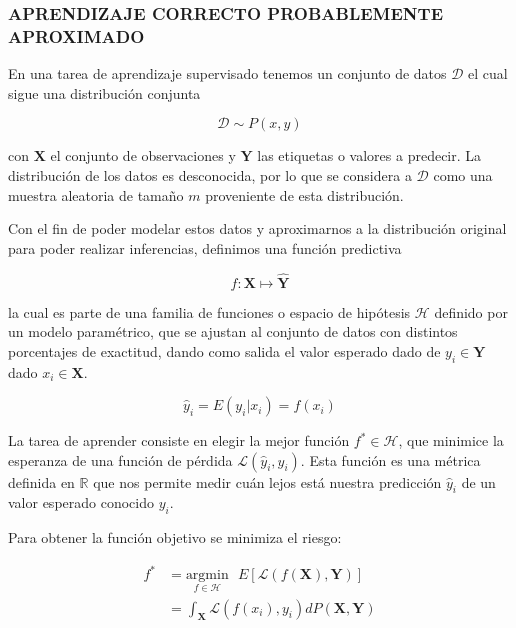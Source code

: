         \subsubsection{APRENDIZAJE CORRECTO PROBABLEMENTE APROXIMADO}
        En una tarea de aprendizaje supervisado tenemos un conjunto de datos $\mathcal{D}$ el cual sigue una distribución conjunta
        
        $$\mathcal{D} \sim P(x, y)$$
        
        \noindent con $\mathbf{X}$ el conjunto de observaciones y $\mathbf{Y}$ las etiquetas o valores a predecir. La distribución de los datos es desconocida, por lo que se considera a $\mathcal{D}$ como una muestra aleatoria de tamaño $m$ proveniente de esta distribución.
        
        Con el fin de poder modelar estos datos y aproximarnos a la distribución original para poder realizar inferencias, definimos una función predictiva
        
        $$f: \mathbf{X} \mapsto \mathbf{\hat{Y}}$$
        
        \noindent la cual es parte de una familia de funciones o espacio de hipótesis $\mathcal{H}$ definido por un modelo paramétrico, que se ajustan al conjunto de datos con distintos porcentajes de exactitud, dando como salida el valor esperado dado de $y_i \in \mathbf{Y}$ dado $x_i \in \mathbf{X}$.
        
        $$\hat{y}_i = E(y_i|x_i) = f(x_i)$$
        
        La tarea de aprender consiste en elegir la mejor función $f^* \in \mathcal{H}$, que minimice la esperanza de una función de pérdida $\mathcal{L}(\hat{y}_i, y_i)$. Esta función es una métrica definida en $\mathbb{R}$ que nos permite medir cuán lejos está nuestra predicción $\hat{y}_i$ de un valor esperado conocido $y_i$.
        
        Para obtener la función objetivo se minimiza el riesgo:
        
        \begin{equation}
        \begin{aligned}
            f^* &= \underset{f \in \mathcal{H}}{\text{argmin}} \text{ } E\left[\mathcal{L}(f(\mathbf{X}), \mathbf{Y})\right]\\
            &= \int_\mathbf{X} \mathcal{L}(f(x_i), y_i)dP(\mathbf{X}, \mathbf{Y})
        \end{aligned}
        \end{equation}
        
